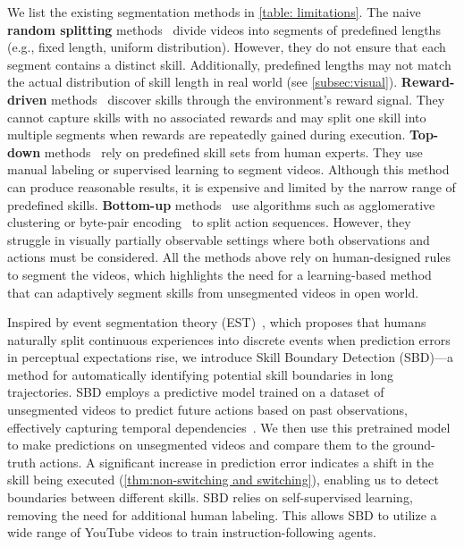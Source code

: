 We list the existing segmentation methods in \cref{table: limitations}. The naive \textbf{random splitting} methods~\citep{groot1,steve1} divide videos into segments of predefined lengths (e.g., fixed length, uniform distribution). However, they do not ensure that each segment contains a distinct skill. Additionally, predefined lengths may not match the actual distribution of skill length in real world (see \cref{subsec:visual}). \textbf{Reward-driven} methods~\citep{option} discover skills through the environment's reward signal. They cannot capture skills with no associated rewards and may split one skill into multiple segments when rewards are repeatedly gained during execution. \textbf{Top-down} methods~\citep{taco,rt-h} rely on predefined skill sets from human experts. They use manual labeling or supervised learning to segment videos. Although this method can produce reasonable results, it is expensive and limited by the narrow range of predefined skills. \textbf{Bottom-up} methods~\citep{buds,FAST} use algorithms such as agglomerative clustering or byte-pair encoding~\citep{bpe} to split action sequences. However, they struggle in visually partially observable settings where both observations and actions must be considered. All the methods above rely on human-designed rules to segment the videos, which highlights the need for a learning-based method that can adaptively segment skills from unsegmented videos in open world.

Inspired by event segmentation theory (EST)~\citep{EST}, which proposes that humans naturally split continuous experiences into discrete events when prediction errors in perceptual expectations rise, we introduce Skill Boundary Detection (SBD)—a method for automatically identifying potential skill boundaries in long trajectories. 
SBD employs a predictive model trained on a dataset of unsegmented videos to predict future actions based on past observations, effectively capturing temporal dependencies~\citep{vpt}. We then use this pretrained model to make predictions on unsegmented videos and compare them to the ground-truth actions. A significant increase in prediction error indicates a shift in the skill being executed (\cref{thm:non-switching and switching}), enabling us to detect boundaries between different skills. SBD relies on self-supervised learning, removing the need for additional human labeling. This allows SBD to utilize a wide range of YouTube videos to train instruction-following agents.

